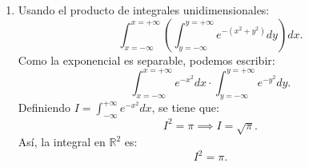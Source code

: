 {\begin{enumerate}
\begin{enumerate}
                  \item Usando el producto de integrales unidimensionales:
                        $$
                            \int_{x = -\infty}^{x = +\infty}\left(\int_{y = -\infty}^{y = +\infty}e^{-(x^2+y^2)}dy\right)dx.
                        $$
                        Como la exponencial es separable, podemos escribir:
                        $$
                            \int_{x=-\infty}^{x=+\infty} e^{-x^2}dx \cdot \int_{y=-\infty}^{y=+\infty} e^{-y^2}dy.
                        $$
                        Definiendo $I = \int_{-\infty}^{+\infty} e^{-x^2}dx$, se tiene que:
                        $$
                            I^2 = \pi \implies I = \sqrt{\pi}.
                        $$
                        Así, la integral en $\mathbb{R}^2$ es:
                        $$
                            I^2 = \pi.
                        $$
              \end{enumerate}
    \end{enumerate}
}

